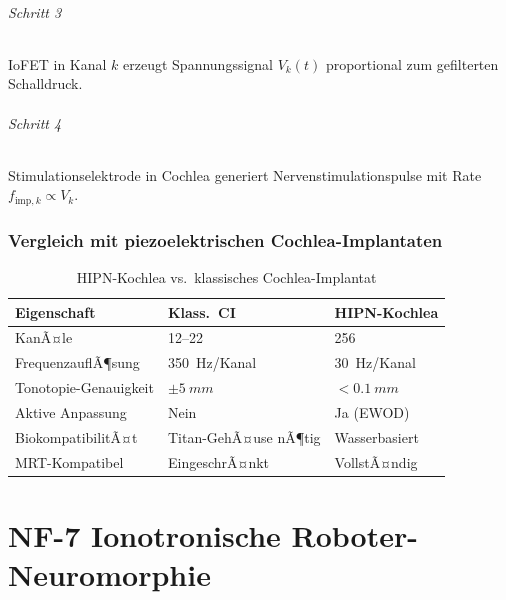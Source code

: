 ﻿\documentclass[a4paper,12pt]{scrreprt}
\theoremstyle{definition}
\begin{document}
\paragraph{Schritt 3} IoFET in Kanal $k$ erzeugt Spannungssignal
$V_k(t)$ proportional zum gefilterten Schalldruck.

\paragraph{Schritt 4} Stimulationselektrode in Cochlea generiert
Nervenstimulationspulse mit Rate $f_{\mathrm{imp},k} \propto V_k$.

\section{Vergleich mit piezoelektrischen Cochlea-Implantaten}

\begin{table}[H]
\caption{HIPN-Kochlea vs.\ klassisches Cochlea-Implantat}
\label{tab:nf6_impl}
\begin{tabular}{lll}
\toprule
\textbf{Eigenschaft}       & \textbf{Klass.\ CI}     & \textbf{HIPN-Kochlea} \\
\midrule
KanÃ¤le                    & 12--22                   & 256 \\
FrequenzauflÃ¶sung         & \SI{350}{Hz/Kanal}       & \SI{30}{Hz/Kanal} \\
Tonotopie-Genauigkeit     & $\pm\SI{5}{mm}$          & $<\SI{0.1}{mm}$ \\
Aktive Anpassung          & Nein                     & Ja (EWOD) \\
BiokompatibilitÃ¤t         & Titan-GehÃ¤use nÃ¶tig      & Wasserbasiert \\
MRT-Kompatibel            & EingeschrÃ¤nkt            & VollstÃ¤ndig \\
\bottomrule
\end{tabular}
\end{table}

\part{NF-7 \quad Ionotronische Roboter-Neuromorphie}
\label{part:nf7}
\end{document}
